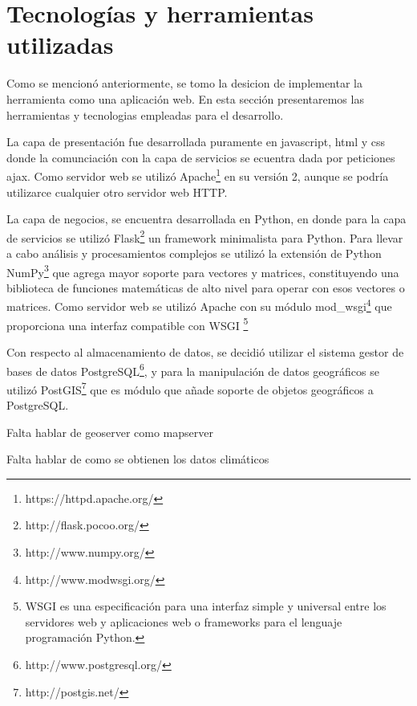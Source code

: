 \section{Tecnologías y herramientas utilizadas}
Como se mencionó anteriormente, se tomo la desicion de implementar la herramienta como una
aplicación web. En esta sección presentaremos las herramientas y tecnologias empleadas para el
desarrollo.

La capa de presentación fue desarrollada puramente en javascript, html y css donde la comunciación
con la capa de servicios se ecuentra dada por peticiones ajax. Como servidor web se utilizó
Apache\footnote{https://httpd.apache.org/} en su versión 2, aunque se podría utilizarce cualquier
otro servidor web HTTP.

La capa de negocios, se encuentra desarrollada en Python, en donde para la capa de servicios se
utilizó Flask\footnote{http://flask.pocoo.org/} un framework minimalista para Python. Para llevar
a cabo análisis y procesamientos complejos se utilizó la extensión de Python
NumPy\footnote{http://www.numpy.org/} que agrega mayor soporte para vectores y matrices,
constituyendo una biblioteca de funciones matemáticas de alto nivel para operar con esos vectores
o matrices. Como servidor web se utilizó Apache con su módulo
mod\_wsgi\footnote{http://www.modwsgi.org/} que proporciona una interfaz compatible con
WSGI \footnote{WSGI es una especificación para una interfaz simple y universal entre los
servidores web y aplicaciones web o frameworks para el lenguaje programación Python.}

Con respecto al almacenamiento de datos, se decidió utilizar el sistema gestor de bases de datos
PostgreSQL\footnote{http://www.postgresql.org/}, y para la manipulación de datos geográficos se utilizó PostGIS\footnote{http://postgis.net/} que es módulo que añade soporte de objetos
geográficos a PostgreSQL.


Falta hablar de geoserver como mapserver

Falta hablar de como se obtienen los datos climáticos
